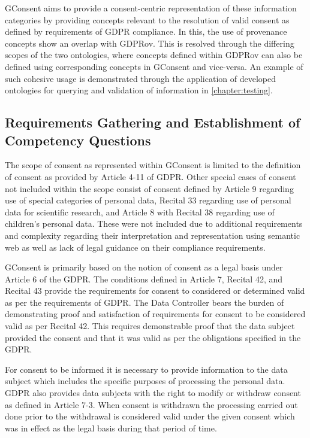 GConsent aims to provide a consent-centric representation of these information categories by providing concepts relevant to the resolution of valid consent as defined by requirements of GDPR compliance. In this, the use of provenance concepts show an overlap with GDPRov.
This is resolved through the differing scopes of the two ontologies, where concepts defined within GDPRov can also be defined using corresponding concepts in GConsent and vice-versa. An example of such cohesive usage is demonstrated through the application of developed ontologies for querying and validation of information in \autoref{chapter:testing}.

\subsection{Requirements Gathering and Establishment of Competency Questions}
The scope of consent as represented within GConsent is limited to the definition of consent as provided by Article 4-11 of GDPR.
Other special cases of consent not included within the scope consist of consent defined by Article 9 regarding use of special categories of personal data, Recital 33 regarding use of personal data for scientific research, and Article 8 with Recital 38 regarding use of children’s personal data.
These were not included due to additional requirements and complexity regarding their interpretation and representation using semantic web as well as lack of legal guidance on their compliance requirements.

GConsent is primarily based on the notion of consent as a legal basis under Article 6 of the GDPR. The conditions defined in Article 7, Recital 42, and Recital 43 provide the requirements for consent to considered or determined valid as per the requirements of GDPR.
The Data Controller bears the burden of demonstrating proof and satisfaction of requirements for consent to be considered valid as per Recital 42. This requires demonstrable proof that the data subject provided the consent and that it was valid as per the obligations specified in the GDPR.

For consent to be informed it is necessary to provide information to the data subject which includes the specific purposes of processing the personal data.
GDPR also provides data subjects with the right to modify or withdraw consent as defined in Article 7-3.
When consent is withdrawn the processing carried out done prior to the withdrawal is considered valid under the given consent which was in effect as the legal basis during that period of time.

